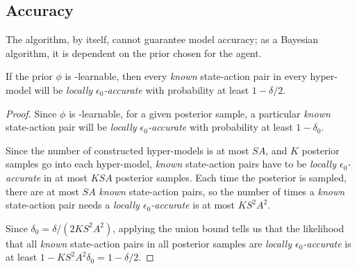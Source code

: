 



\subsection{Accuracy}

The  algorithm, by itself, cannot guarantee model accuracy; as a Bayesian algorithm, it is dependent on the prior chosen for the agent.

\begin{lemma}
\label{sec:boss:lemma:acc}
If the prior $\phi$ is \bed-learnable, then every \emph{known} state-action pair in every hyper-model will be \emph{locally $\epsilon_0$-accurate} with probability at least $1-\delta/2$.
\end{lemma}

\begin{proof}
Since $\phi$ is \bed-learnable, for a given posterior sample, a particular \emph{known} state-action pair will be \emph{locally $\epsilon_0$-accurate} with probability at least $1-\delta_0$.

Since the number of constructed hyper-models is at most $S A$, and $K$ posterior samples go into each hyper-model, \emph{known} state-action pairs have to be \emph{locally $\epsilon_0$-accurate} in at most $K S A$ posterior samples. Each time the posterior is sampled, there are at most $S A$ \emph{known} state-action pairs, so the number of times a \emph{known} state-action pair needs a \emph{locally $\epsilon_0$-accurate} is at most $K S^2 A^2$.

Since $\delta_0 = \delta/(2KS^2A^2)$, applying the union bound tells us that the likelihood that all \emph{known} state-action pairs in all posterior samples are \emph{locally $\epsilon_0$-accurate} is at least $1-KS^2A^2\delta_0 = 1-\delta/2$.

\end{proof}

